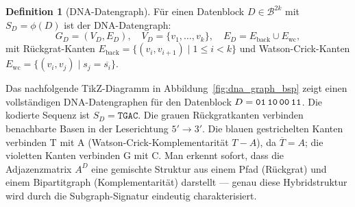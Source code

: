 ﻿\documentclass[a4paper,12pt]{article}
\theoremstyle{definition}
\newtheorem{definition}{Definition}[section]
\theoremstyle{plain}
\begin{document}
\begin{definition}[DNA-Datengraph]
\label{def:dna_graph}
  Für einen Datenblock $D \in \mathcal{B}^{2k}$ mit $S_D = \phi(D)$ ist
  der DNA-Datengraph:
  \[
    G_D = (V_D, E_D),
    \quad V_D = \{v_1, \ldots, v_k\},
    \quad E_D = E_{\mathrm{back}} \cup E_{\mathrm{wc}},
  \]
  mit Rückgrat-Kanten $E_{\mathrm{back}} = \{(v_i, v_{i+1}) \mid 1 \le i < k\}$
  und Watson-Crick-Kanten $E_{\mathrm{wc}} = \{(v_i, v_j) \mid s_j = \overline{s_i}\}$.
\end{definition}

Das nachfolgende TikZ-Diagramm in Abbildung~\ref{fig:dna_graph_bsp} zeigt
einen vollständigen DNA-Datengraphen für den Datenblock
$D = \texttt{01\,10\,00\,11}$.  Die kodierte Sequenz ist
$S_D = \texttt{TGAC}$.  Die grauen Rückgratkanten verbinden benachbarte
Basen in der Leserichtung $5' \to 3'$.  Die blauen gestrichelten Kanten
verbinden T mit A (Watson-Crick-Komplementarität $T{-}A$), da
$\overline{T} = A$; die violetten Kanten verbinden G mit C.
Man erkennt sofort, dass die Adjazenzmatrix $A^D$ eine gemischte Struktur
aus einem Pfad (Rückgrat) und einem Bipartitgraph (Komplementarität)
darstellt --- genau diese Hybridstruktur wird durch die Subgraph-Signatur
eindeutig charakterisiert.
\end{document}
